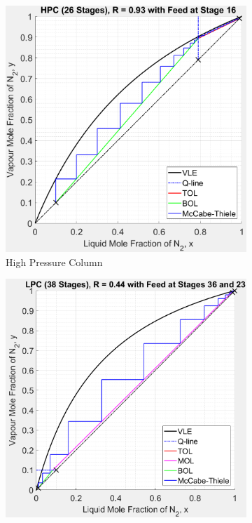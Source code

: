 \documentclass[11pt, oneside]{article}
\begin{document}
    \begin{figure}[ht]
        \begin{subfigure}{0.49\textwidth}
            \includegraphics[width=\linewidth]{airseparation/handouts/graphics/HPC_v0a.jpg}
            \caption{High Pressure Column}
            \label{fig:HPC_v0}
        \end{subfigure}
        \hspace*{\fill} %
        \begin{subfigure}{0.49\textwidth}
            \includegraphics[width=\linewidth]{airseparation/handouts/graphics/LPC_v0a.jpg}

\end{subfigure}
\end{figure}
\end{document}
